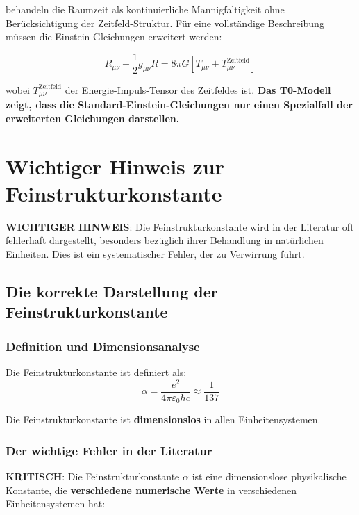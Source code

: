 \documentclass[12pt,a4paper]{report}
\begin{document}
	behandeln die Raumzeit als kontinuierliche Mannigfaltigkeit ohne Berücksichtigung der Zeitfeld-Struktur. Für eine vollständige Beschreibung müssen die Einstein-Gleichungen erweitert werden:
	
	\begin{equation}
		R_{\mu\nu} - \frac{1}{2}g_{\mu\nu}R = 8\pi G[T_{\mu\nu} + T_{\mu\nu}^{\text{Zeitfeld}}]
	\end{equation}
	
	wobei $T_{\mu\nu}^{\text{Zeitfeld}}$ der Energie-Impuls-Tensor des Zeitfeldes ist. \textbf{Das T0-Modell zeigt, dass die Standard-Einstein-Gleichungen nur einen Spezialfall der erweiterten Gleichungen darstellen.}
	
	\section{Wichtiger Hinweis zur Feinstrukturkonstante}
	
	\textbf{WICHTIGER HINWEIS}: Die Feinstrukturkonstante wird in der Literatur oft fehlerhaft dargestellt, besonders bezüglich ihrer Behandlung in natürlichen Einheiten. Dies ist ein systematischer Fehler, der zu Verwirrung führt.
	
	\subsection{Die korrekte Darstellung der Feinstrukturkonstante}
	
	\subsubsection{Definition und Dimensionsanalyse}
	
	Die Feinstrukturkonstante ist definiert als:
	\begin{equation}
		\alpha = \frac{e^2}{4\pi\varepsilon_0\hbar c} \approx \frac{1}{137}
	\end{equation}
	
	Die Feinstrukturkonstante ist \textbf{dimensionslos} in allen Einheitensystemen.
	
	\subsubsection{Der wichtige Fehler in der Literatur}
	
	\textbf{KRITISCH}: Die Feinstrukturkonstante $\alpha$ ist eine dimensionslose physikalische Konstante, die \textbf{verschiedene numerische Werte} in verschiedenen Einheitensystemen hat:
	
\end{document}
